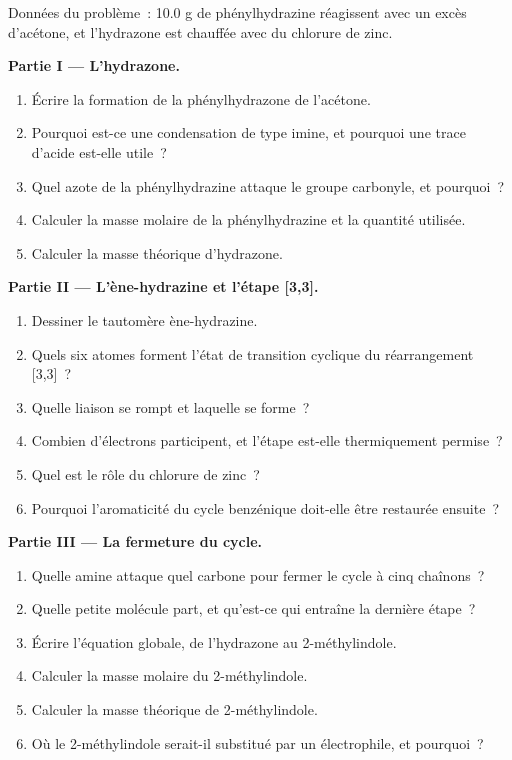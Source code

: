 \begin{problem}
\label{pb:b3:heterocycles:1}
Données du problème~: 10.0 g de phénylhydrazine réagissent avec un excès
d'acétone, et l'hydrazone est chauffée avec du chlorure de zinc.

\medskip\noindent\textbf{Partie I --- L'hydrazone.}
\begin{enumerate}
  \item Écrire la formation de la phénylhydrazone de l'acétone.
  \item Pourquoi est-ce une condensation de type imine, et pourquoi une
        trace d'acide est-elle utile~?
  \item Quel azote de la phénylhydrazine attaque le groupe carbonyle, et
        pourquoi~?
  \item Calculer la masse molaire de la phénylhydrazine et la quantité
        utilisée.
  \item Calculer la masse théorique d'hydrazone.
\end{enumerate}

\medskip\noindent\textbf{Partie II --- L'ène-hydrazine et l'étape [3,3].}
\begin{enumerate}[resume]
  \item Dessiner le tautomère ène-hydrazine.
  \item Quels six atomes forment l'état de transition cyclique du
        réarrangement [3,3]~?
  \item Quelle liaison se rompt et laquelle se forme~?
  \item Combien d'électrons participent, et l'étape est-elle thermiquement
        permise~?
  \item Quel est le rôle du chlorure de zinc~?
  \item Pourquoi l'aromaticité du cycle benzénique doit-elle être restaurée
        ensuite~?
\end{enumerate}

\medskip\noindent\textbf{Partie III --- La fermeture du cycle.}
\begin{enumerate}[resume]
  \item Quelle amine attaque quel carbone pour fermer le cycle à cinq
        chaînons~?
  \item Quelle petite molécule part, et qu'est-ce qui entraîne la dernière
        étape~?
  \item Écrire l'équation globale, de l'hydrazone au 2-méthylindole.
  \item Calculer la masse molaire du 2-méthylindole.
  \item Calculer la masse théorique de 2-méthylindole.
  \item Où le 2-méthylindole serait-il substitué par un électrophile, et
        pourquoi~?
\end{enumerate}


\end{problem}
